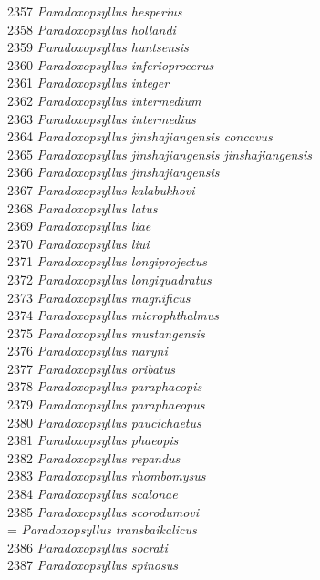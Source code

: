 \documentclass[
]{article}
\begin{document}
2357 \emph{Paradoxopsyllus hesperius}\\
2358 \emph{Paradoxopsyllus hollandi}\\
2359 \emph{Paradoxopsyllus huntsensis}\\
2360 \emph{Paradoxopsyllus inferioprocerus}\\
2361 \emph{Paradoxopsyllus integer}\\
2362 \emph{Paradoxopsyllus intermedium}\\
2363 \emph{Paradoxopsyllus intermedius}\\
2364 \emph{Paradoxopsyllus jinshajiangensis concavus}\\
2365 \emph{Paradoxopsyllus jinshajiangensis jinshajiangensis}\\
2366 \emph{Paradoxopsyllus jinshajiangensis}\\
2367 \emph{Paradoxopsyllus kalabukhovi}\\
2368 \emph{Paradoxopsyllus latus}\\
2369 \emph{Paradoxopsyllus liae}\\
2370 \emph{Paradoxopsyllus liui}\\
2371 \emph{Paradoxopsyllus longiprojectus}\\
2372 \emph{Paradoxopsyllus longiquadratus}\\
2373 \emph{Paradoxopsyllus magnificus}\\
2374 \emph{Paradoxopsyllus microphthalmus}\\
2375 \emph{Paradoxopsyllus mustangensis}\\
2376 \emph{Paradoxopsyllus naryni}\\
2377 \emph{Paradoxopsyllus oribatus}\\
2378 \emph{Paradoxopsyllus paraphaeopis}\\
2379 \emph{Paradoxopsyllus paraphaeopus}\\
2380 \emph{Paradoxopsyllus paucichaetus}\\
2381 \emph{Paradoxopsyllus phaeopis}\\
2382 \emph{Paradoxopsyllus repandus}\\
2383 \emph{Paradoxopsyllus rhombomysus}\\
2384 \emph{Paradoxopsyllus scalonae}\\
2385 \emph{Paradoxopsyllus scorodumovi}\\
= \emph{Paradoxopsyllus transbaikalicus}\\
2386 \emph{Paradoxopsyllus socrati}\\
2387 \emph{Paradoxopsyllus spinosus}\\
\end{document}
